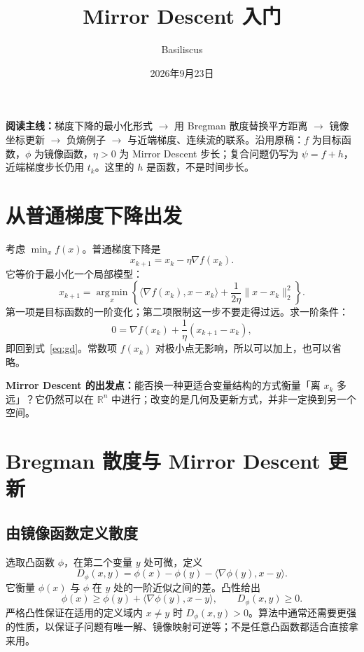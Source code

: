 \documentclass[11pt,a4paper]{ctexart}
\title{Mirror Descent 入门}
\author{Basiliscus}
\date{2026年9月23日}
\newcommand{\argmin}{\operatorname*{arg\,min}}
\newcommand{\R}{\mathbb R}
\begin{document}
\maketitle
\vspace{-1.2em}

\noindent\textbf{阅读主线：}梯度下降的最小化形式 $\to$ 用 Bregman 散度替换平方距离 $\to$ 镜像坐标更新 $\to$ 负熵例子 $\to$ 与近端梯度、连续流的联系。沿用原稿：$f$ 为目标函数，$\phi$ 为镜像函数，$\eta>0$ 为 Mirror Descent 步长；复合问题仍写为 $\psi=f+h$，近端梯度步长仍用 $t_k$。这里的 $h$ 是函数，不是时间步长。

\section{从普通梯度下降出发}
考虑 $\min_x f(x)$。普通梯度下降是
\begin{equation}\label{eq:gd}
x_{k+1}=x_k-\eta\nabla f(x_k).
\end{equation}
它等价于最小化一个局部模型：
\begin{equation}\label{eq:gd-model}
x_{k+1}=\argmin_x\left\{
\langle\nabla f(x_k),x-x_k\rangle+\frac{1}{2\eta}\|x-x_k\|_2^2
\right\}.
\end{equation}
第一项是目标函数的一阶变化；第二项限制这一步不要走得过远。求一阶条件：
\[
0=\nabla f(x_k)+\frac1\eta(x_{k+1}-x_k),
\]
即回到式~\eqref{eq:gd}。常数项 $f(x_k)$ 对极小点无影响，所以可以加上，也可以省略。

\textbf{Mirror Descent 的出发点：}能否换一种更适合变量结构的方式衡量「离 $x_k$ 多远」？它仍然可以在 $\R^n$ 中进行；改变的是几何及更新方式，并非一定换到另一个空间。

\section{Bregman 散度与 Mirror Descent 更新}
\subsection{由镜像函数定义散度}
选取凸函数 $\phi$，在第二个变量 $y$ 处可微，定义
\begin{equation}\label{eq:bregman}
\boxed{D_\phi(x,y)=\phi(x)-\phi(y)-\langle\nabla\phi(y),x-y\rangle.}
\end{equation}
它衡量 $\phi(x)$ 与 $\phi$ 在 $y$ 处的一阶近似之间的差。凸性给出
\[
\phi(x)\geq\phi(y)+\langle\nabla\phi(y),x-y\rangle,
\qquad D_\phi(x,y)\geq0.
\]
严格凸性保证在适用的定义域内 $x\neq y$ 时 $D_\phi(x,y)>0$。算法中通常还需要更强的性质，以保证子问题有唯一解、镜像映射可逆等；不是任意凸函数都适合直接拿来用。
\end{document}
